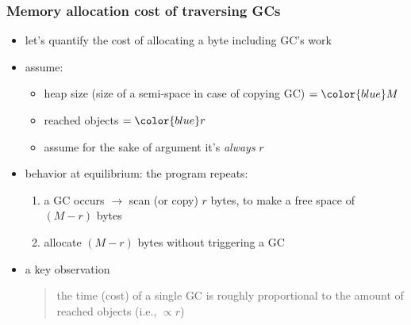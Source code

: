 \documentclass[11pt,dvipdfmx]{beamer}
\newcommand{\ao}[1]{{\color{blue}#1}}
\begin{document}
\begin{frame}
\frametitle{Memory allocation cost of traversing GCs}
\begin{itemize}
\item let's quantify the cost of
  allocating a byte including GC's work
  
\item assume:
  \begin{itemize}
  \item heap size (size of a semi-space in case of copying GC) $= \ao{M}$
  \item reached objects $= \ao{r}$
  \item {\footnotesize assume for the sake of argument it's {\it always} $r$}
  \end{itemize}

\item<3-> behavior at equilibrium: the program repeats:
  \begin{enumerate}
  \item a GC occurs $\rightarrow$ scan (or copy) $r$ bytes,
    to make a free space of $(M - r)$ bytes
  \item allocate $(M - r)$ bytes without triggering a GC
  \end{enumerate}

\item<4-> a key observation
\begin{quote}
  the time (cost) of a single GC
  is roughly proportional to the amount of reached objects (i.e., $\propto r$)
\end{quote}
  
\end{itemize}

\begin{center}
%
%
%
\end{center}

\end{frame}
\end{document}
